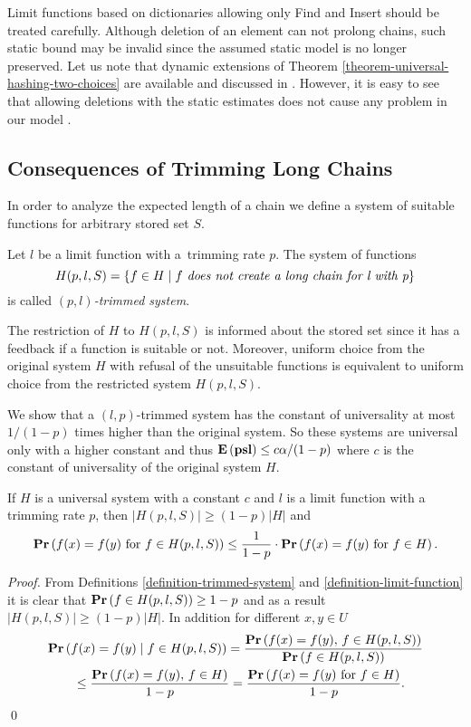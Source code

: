 Limit functions based on dictionaries allowing only Find and Insert should be treated carefully. Although deletion of an element can not prolong chains, such static bound may be invalid since the assumed static model is no longer preserved. Let us note that dynamic extensions of Theorem \ref{theorem-universal-hashing-two-choices} are available and discussed in \cite{DBLP:journals/jacm/Vocking03}. However, it is easy to see that allowing deletions with the static estimates does not cause any problem in our model .

\subsection{Consequences of Trimming Long Chains}
In order to analyze the expected length of a chain we define a system of suitable functions for arbitrary stored set $S$.
\begin{definition}
\label{definition-trimmed-system}
Let $l$ be a limit function with a~trimming rate $p$. The system of functions \[ H(p, l, S) = \{ f \in H \mid f \textit{ does not create a long chain for l with p} \} \] is called \emph{$(p, l)$-trimmed system}.
\end{definition}

The restriction of $H$ to $H(p, l, S)$ is informed about the stored set since it has a feedback if a function is suitable or not. Moreover, uniform choice from the original system $H$ with refusal of the unsuitable functions is equivalent to uniform choice from the restricted system $H(p, l, S)$.

We show that a $(l, p)$-trimmed system has the constant of universality at most $1 / (1 - p)$ times higher than the original system. So these systems are universal only with a higher constant and thus $\mathbf{E}\left(\mathbf{psl}\right) \leq c\alpha/(1-p)$ where $c$ is the constant of universality of the original system $H$.

\begin{lemma}
\label{lemma-trimmed-system}
If $H$ is a universal system with a constant $c$ and $l$ is a limit function with a trimming rate $p$, then $|H(p, l, S)| \geq (1 - p)|H|$ and  \[ \mathbf{Pr}\left(f(x) = f(y) \mbox{ for } f \in H(p, l, S)\right) \leq \frac{1}{1 - p} \cdot \mathbf{Pr}\left(f(x) = f(y) \mbox{ for } f \in H\right). \]
\end{lemma}
\begin{proof}
From Definitions \ref{definition-trimmed-system} and \ref{definition-limit-function} it is clear that $\mathbf{Pr}\left(f \in H(p, l, S)\right) \geq 1 - p$ and as a result $|H(p, l, S)| \geq (1 - p)|H|$. In addition for different $x, y \in U$ 
\[
\begin{split}
& \mathbf{Pr}\left(f(x) = f(y) \mid f \in H(p, l, S)\right) 
	= \frac{\mathbf{Pr}\left(f(x) = f(y),\, f \in H(p, l, S)\right)}{\mathbf{Pr}\left(f \in H(p, l, S)\right)} \\
	& \qquad \leq \frac{\mathbf{Pr}\left(f(x) = f(y),\, f \in H\right)}{1 - p} = \frac{\mathbf{Pr}\left(f(x) = f(y) \mbox{ for } f \in H\right)}{1 - p}. \\
\end{split}
\]
\qed
\end{proof}


